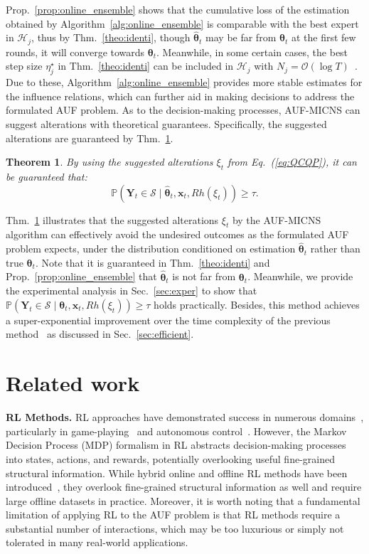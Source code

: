\documentclass{article}
\theoremstyle{plain}
\newtheorem{theorem}{Theorem}[section]
\theoremstyle{definition}
\theoremstyle{remark}
\def \Eq {Eq.}
\def \Sec {Sec.}
\def \prop {Prop.}
\def \thm {Thm.}
\def \x {\mathbf{x}}
\def \sH {\mathcal{H}}
\def \sS {\mathcal{S}}
\def \Y {\mathbf{Y}}
\begin{document}
\prop~\ref{prop:online_ensemble} shows that the cumulative loss of the estimation obtained by Algorithm~\ref{alg:online_ensemble} is comparable with the best expert in $\sH_j$, 
thus by \thm~\ref{theo:identi}, though $\hat{\bm{\theta}}_t$ may be far from $\bm{\theta}_t$ at the first few rounds, it will converge towards $\bm{\theta}_t$.
Meanwhile, in some certain cases, the best step size $\eta^\star_j$ in \thm~\ref{theo:identi} can be included in $\sH_j$ with $N_j=\mathcal{O}(\log T)$~\citep{zhao2024adaptivity}. 
Due to these, Algorithm~\ref{alg:online_ensemble} provides more stable estimates for the influence relations, 
which can further aid in making decisions to address the formulated AUF problem. 
As to the decision-making processes, AUF-MICNS can suggest alterations with theoretical guarantees.
Specifically, the suggested alterations are guaranteed by \thm~\ref{prop:auf_y_hat}.  

\begin{theorem}
  \label{prop:auf_y_hat}
  By using the suggested alterations $\xi_t$ from \Eq~(\ref{eq:QCQP}),
  it can be guaranteed that: 
  \vskip -0.15in
  \[
    \mathbb{P}\left(\Y_t\in\sS \mid \hat{\bm{\theta}}_t, \x_t, Rh(\xi_t)\right) \geq \tau. 
  \]
\end{theorem}
\vskip -0.05in

\thm~\ref{prop:auf_y_hat} illustrates that the suggested alterations $\xi_t$ by the AUF-MICNS algorithm can effectively avoid the undesired outcomes as the formulated AUF problem expects, 
under the distribution conditioned on estimation $\hat{\bm{\theta}}_t$ rather than true $\bm{\theta}_t$. 
Note that it is guaranteed in \thm~\ref{theo:identi} and \prop~\ref{prop:online_ensemble} that $\hat{\bm{\theta}}_t$ is not far from $\bm{\theta}_t$. 
Meanwhile, we provide the experimental analysis in \Sec~\ref{sec:exper} to show that $\mathbb{P}\left(\Y_t\in\sS \mid \bm{\theta}_t, \x_t, Rh(\xi_t)\right)\geq \tau$ holds practically. Besides, this method achieves a super-exponential improvement over the time complexity of the previous method~\cite{qint2023srm} as discussed in \Sec~\ref{sec:efficient}.




\section{Related work}
\label{sec:related_work}


\textbf{RL Methods.} RL approaches have demonstrated success in numerous domains~\citep{sutton2018reinforcement}, particularly in game-playing~\citep{mnih2013playing} and autonomous control~\citep{KiumarsiVML18TNN}. However, the Markov Decision Process (MDP) formalism in RL abstracts decision-making processes into states, actions, and rewards, potentially overlooking useful fine-grained structural information. While hybrid online and offline RL methods have been introduced~\citep{song2022hybrid, pong2022offline}, they overlook fine-grained structural information as well and require large offline datasets in practice. Moreover, it is worth noting that a fundamental limitation of applying RL to the AUF problem is that RL methods require a substantial number of interactions, which may be too luxurious or simply not tolerated in many real-world applications.
\end{document}
